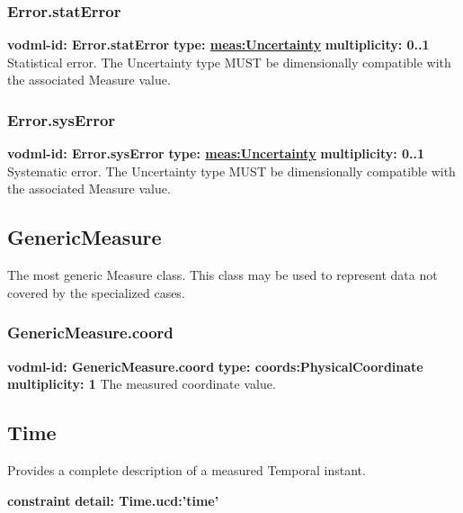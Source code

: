     \subsubsection{Error.statError}
      \textbf{vodml-id: Error.statError} \newline
      \textbf{type: \hyperref[sect:Uncertainty]{meas:Uncertainty}} \newline
      \textbf{multiplicity: 0..1} \newline 
      Statistical error. The Uncertainty type MUST be dimensionally compatible with the associated Measure value.

    \subsubsection{Error.sysError}
      \textbf{vodml-id: Error.sysError} \newline
      \textbf{type: \hyperref[sect:Uncertainty]{meas:Uncertainty}} \newline
      \textbf{multiplicity: 0..1} \newline 
      Systematic error. The Uncertainty type MUST be dimensionally compatible with the associated Measure value.


  \subsection{GenericMeasure}
  \label{sect:GenericMeasure}
    The most generic Measure class. This class may be used to represent data not covered by the specialized cases.

    \subsubsection{GenericMeasure.coord}
      \textbf{vodml-id: GenericMeasure.coord} \newline
      \textbf{type: coords:PhysicalCoordinate} \newline
      \textbf{multiplicity: 1} \newline 
      The measured coordinate value.

  \subsection{Time}
  \label{sect:Time}
    Provides a complete description of a measured Temporal instant.

    \noindent \textbf{constraint} \newline
    \indent    \textbf{detail: Time.ucd:'time' }\newline

